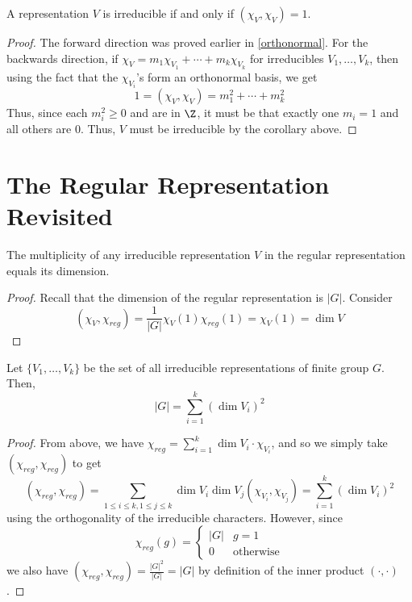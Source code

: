 \documentclass[11pt,leqno,oneside]{amsbook}
\numberwithin{thm}{section}
\begin{document}
\begin{cor}
  A representation \(V\) is irreducible if and only if \((\chi_V,
  \chi_V) = 1\). 
\end{cor}
\begin{proof}
  The forward direction was proved earlier in \ref{orthonormal}. For the
  backwards direction, if \(\chi_V = m_1 \chi_{V_1} + \cdots + m_k
  \chi_{V_k}\) for irreducibles \(V_1, \ldots, V_k\), then using the
  fact that the \(\chi_{V_i}\)'s form an orthonormal basis, we get \[
    1 = (\chi_V, \chi_V) = m_1^2 + \cdots + m_k^2
  \]
  Thus, since each \(m_i^2 \geq 0\) and are in \(\Z\), it must be that
  exactly one \(m_i = 1\) and all others are \(0\). Thus, \(V\) must
  be irreducible by the corollary above.
\end{proof}
\section{The Regular Representation Revisited}
\begin{cor}
  The multiplicity of any irreducible representation \(V\) in the regular
  representation equals its dimension.
\end{cor}
\begin{proof}
  Recall that the dimension of the regular representation is \(|G|\). Consider \[
    (\chi_V, \chi_{reg}) = \frac{1}{|G|}\chi_V(1) \chi_{reg}(1) =
    \chi_V(1) = \dim V
  \]
\end{proof}
\begin{cor}
  Let \(\{V_1, \ldots, V_k\}\) be the set of all irreducible
  representations of finite group \(G\). Then, \[
    |G| = \sum_{i=1}^k (\dim V_i)^2
  \]
\end{cor}
\begin{proof}
  From above, we have \(\chi_{reg} = \sum_{i=1}^k \dim V_i \cdot
  \chi_{V_i}\), and so we simply take \((\chi_{reg}, \chi_{reg})\) to
  get \[
    (\chi_{reg}, \chi_{reg}) = \sum_{1\leq i \leq k, 1 \leq j \leq k}
    \dim V_i \dim V_j (\chi_{V_i}, \chi_{V_j}) = \sum_{i=1}^k (\dim
    V_i)^2
  \]
  using the orthogonality of the irreducible characters. However,
  since \[
    \chi_{reg}(g) =
    \begin{cases}
      |G| & g = 1 \\
      0 & \text{otherwise}
    \end{cases}
  \]
  we also have \((\chi_{reg}, \chi_{reg}) = \frac{|G|^2}{|G|} = |G|\)
  by definition of the inner product \((\cdot, \cdot)\).
\end{proof}
\end{document}
